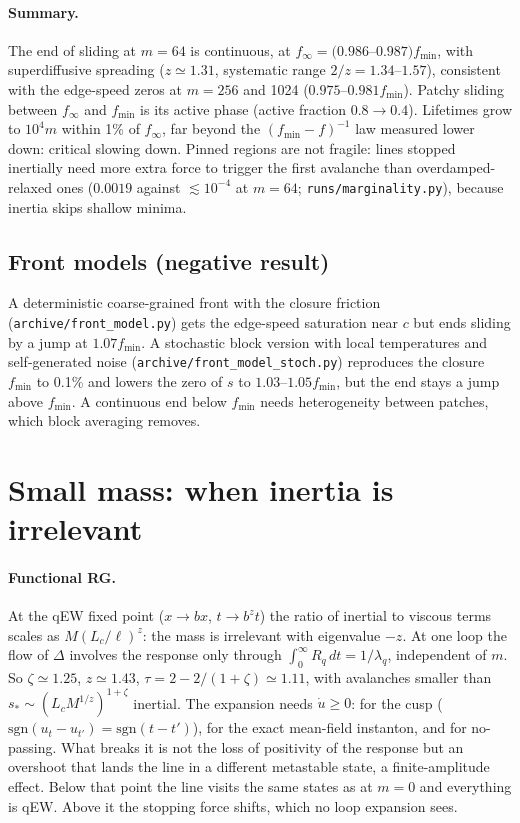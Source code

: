 \documentclass[10pt,a4paper]{article}
\begin{document}
\paragraph{Summary.} The end of sliding at $m=64$ is continuous, at $f_\infty=(0.986$--$0.987)f_{\min}$, with superdiffusive spreading ($z\simeq1.31$, systematic range $2/z=1.34$--$1.57$), consistent with the edge-speed zeros at $m=256$ and 1024 ($0.975$--$0.981f_{\min}$). Patchy sliding between $f_\infty$ and $f_{\min}$ is its active phase (active fraction $0.8\to0.4$). Lifetimes grow to $10^4m$ within 1\% of $f_\infty$, far beyond the $(f_{\min}-f)^{-1}$ law measured lower down: critical slowing down. Pinned regions are not fragile: lines stopped inertially need more extra force to trigger the first avalanche than overdamped-relaxed ones ($0.0019$ against $\lesssim10^{-4}$ at $m=64$; \texttt{runs/marginality.py}), because inertia skips shallow minima.

\subsection{Front models (negative result)}

A deterministic coarse-grained front with the closure friction (\texttt{archive/front\_model.py}) gets the edge-speed saturation near $c$ but ends sliding by a jump at $1.07f_{\min}$. A stochastic block version with local temperatures and self-generated noise (\texttt{archive/front\_model\_stoch.py}) reproduces the closure $f_{\min}$ to 0.1\% and lowers the zero of $s$ to $1.03$--$1.05f_{\min}$, but the end stays a jump above $f_{\min}$. A continuous end below $f_{\min}$ needs heterogeneity between patches, which block averaging removes.

\section{Small mass: when inertia is irrelevant}
\label{sec:small}

\paragraph{Functional RG.} At the qEW fixed point ($x\to bx$, $t\to b^zt$) the ratio of inertial to viscous terms scales as $M(L_c/\ell)^z$: the mass is irrelevant with eigenvalue $-z$. At one loop the flow of $\Delta$ involves the response only through $\int_0^\infty R_q\,dt=1/\lambda_q$, independent of $m$. So $\zeta\simeq1.25$, $z\simeq1.43$, $\tau=2-2/(1+\zeta)\simeq1.11$, with avalanches smaller than $s_*\sim(L_cM^{1/z})^{1+\zeta}$ inertial. The expansion needs $\dot u\ge0$: for the cusp ($\mathrm{sgn}(u_t-u_{t'})=\mathrm{sgn}(t-t')$), for the exact mean-field instanton, and for no-passing. What breaks it is not the loss of positivity of the response but an overshoot that lands the line in a different metastable state, a finite-amplitude effect. Below that point the line visits the same states as at $m=0$ and everything is qEW. Above it the stopping force shifts, which no loop expansion sees.
\end{document}
